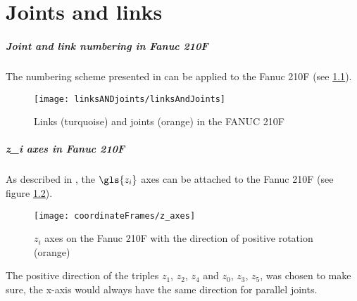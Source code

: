 
\chapter{Joints and links} \label{sec:jointsandlinks}


\paragraph{Joint and link numbering in Fanuc 210F} \label{sec:JointLinkNumbering}
The numbering scheme presented in  can be applied to the Fanuc 210F (see  \cref{fig:LinksANDJoints210F}). 


\begin{figure}[H]
	\texttt{[image: linksANDjoints/linksAndJoints]}
	\caption{Links (turquoise) and joints (orange) in the FANUC 210F}
	\label{fig:LinksANDJoints210F}
\end{figure}

\paragraph{\textbf{\gls{z_i}} axes in Fanuc 210F}
As described in , the $\gls{z_i}$ axes can be attached to the Fanuc 210F (see figure \ref{fig:zi_Axes}).


\begin{figure}[H]
	\texttt{[image: coordinateFrames/z\_axes]}
	\caption{$z_i$ axes on the Fanuc 210F with the direction of positive rotation (orange)}
	\label{fig:zi_Axes}
\end{figure}


The positive direction of the triples $z_1$, $z_2$, $z_4$ and $z_0$, $z_3$, $z_5$, was chosen to make sure, the x-axis would always have the same direction for parallel joints. 
